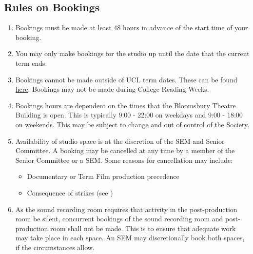 \documentclass[]{article}
\begin{document}
\subsection{Rules on Bookings}
\begin{enumerate}
    \item Bookings must be made at least 48 hours in advance of the start time of your booking.
    \item You may only make bookings for the studio up until the date that the current term ends.
    \item Bookings cannot be made outside of UCL term dates. These can be found \href{https://www.ucl.ac.uk/students/life-ucl/term-dates-and-closures-2021-22}{here}. Bookings may not be made during College Reading Weeks.
    \item Bookings hours are dependent on the times that the Bloomsbury Theatre Building is open. This is typically 9:00 - 22:00 on weekdays and 9:00 - 18:00 on weekends. This may be subject to change and out of control of the Society.
    \item Availability of studio space is at the discretion of the SEM and Senior Committee. A booking may be cancelled at any time by a member of the Senior Committee or a SEM. Some reasons for cancellation may include:
          \begin{itemize}
              \item Documentary or Term Film production precedence
              \item Consequence of strikes (see )
          \end{itemize}
    \item As the sound recording room requires that activity in the post-production room be silent, concurrent bookings of the sound recording room and post-production room shall not be made. This is to ensure that adequate work may take place in each space. An SEM may discretionally book both spaces, if the circumstances allow.
\end{enumerate}
\end{document}
